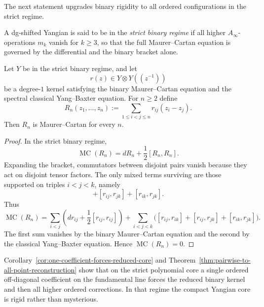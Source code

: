 The next statement upgrades binary rigidity to all ordered
configurations in the strict regime.

\begin{definition}
\label{def:strict-binary-regime}
A dg-shifted Yangian is said to be in the \emph{strict binary regime} if
all higher $A_\infty$-operations $m_k$ vanish for $k\ge 3$, so that the
full Maurer--Cartan equation is governed by the differential and the
binary bracket alone.
\end{definition}

\begin{theorem}
\ClaimStatusProvedHere
\label{thm:pairwise-to-all-point-reconstruction}
Let $Y$ be in the strict binary regime, and let
\begin{equation}
r(z)\in Y\otimes Y((z^{-1}))
\end{equation}
be a degree-$1$ kernel satisfying the binary Maurer--Cartan equation and
the spectral classical Yang--Baxter equation.  For $n\ge 2$ define
\begin{equation}
R_n(z_1,\dots,z_n):=\sum_{1\le i<j\le n} r_{ij}(z_i-z_j).
\end{equation}
Then $R_n$ is Maurer--Cartan for every $n$.
\end{theorem}

\begin{proof}
In the strict binary regime,
\begin{equation}
\operatorname{MC}(R_n)=dR_n+\frac12[R_n,R_n].
\end{equation}
Expanding the bracket, commutators between disjoint pairs vanish because
they act on disjoint tensor factors.  The only mixed terms surviving are
those supported on triples $i<j<k$, namely
\begin{equation}
[r_{ij},r_{ik}]+[r_{ij},r_{jk}]+[r_{ik},r_{jk}].
\end{equation}
Thus
\begin{equation}
\operatorname{MC}(R_n)
=
\sum_{i<j}\left(dr_{ij}+\frac12[r_{ij},r_{ij}]\right)
+
\sum_{i<j<k}\Big([r_{ij},r_{ik}]+[r_{ij},r_{jk}]+[r_{ik},r_{jk}]\Big).
\end{equation}
The first sum vanishes by the binary Maurer--Cartan equation and the
second by the classical Yang--Baxter equation.  Hence
$\operatorname{MC}(R_n)=0$.
\end{proof}

\begin{remark}
\label{rem:compact-core-consequence}
Corollary~\ref{cor:one-coefficient-forces-reduced-core} and
Theorem~\ref{thm:pairwise-to-all-point-reconstruction} show that on the
strict polynomial core a single ordered off-diagonal coefficient on the
fundamental line forces the reduced binary kernel and then all higher
ordered corrections.  In that regime the compact Yangian core is rigid
rather than mysterious.
\end{remark}

